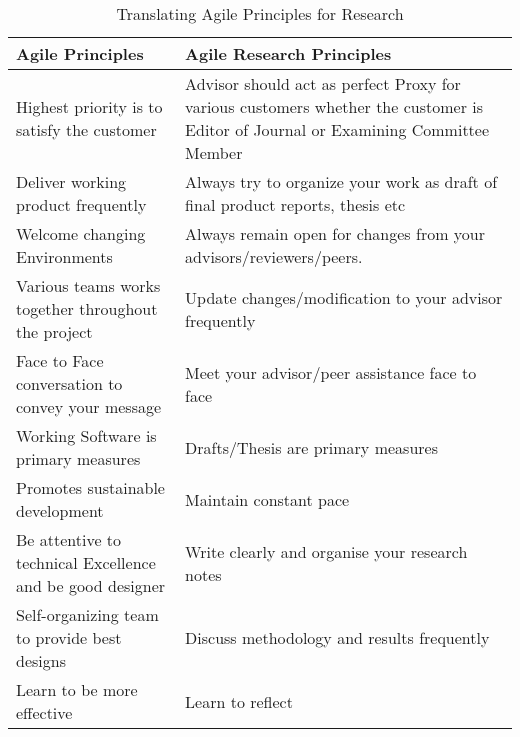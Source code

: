 \begin{table}[htbp]
	\caption{Translating Agile Principles for Research}
	\centering
	\begin{tabular}{|L|L|}
		\hline
		\textbf{Agile Principles} & \textbf{Agile Research Principles}
		\\ \hline
		Highest priority is to satisfy the customer & Advisor should act as perfect Proxy for various customers whether the customer is Editor of Journal or Examining Committee Member
		\\ \hline
		Deliver working product frequently & Always try to organize your work  as draft of final product reports, thesis etc
		\\ \hline
		Welcome changing Environments & Always remain open for changes from your advisors/reviewers/peers.
		\\ \hline
		Various teams works together throughout the project & Update changes/modification to your advisor frequently
		\\ \hline
		Face to Face conversation to convey your message & Meet your advisor/peer assistance face to face
		\\ \hline
		Working Software is primary measures & Drafts/Thesis are primary measures
		\\ \hline
		Promotes sustainable development & Maintain constant pace
		\\ \hline
		Be attentive to technical Excellence and be good designer & Write clearly and organise your research notes
		\\ \hline
		Self-organizing team to provide best designs & Discuss methodology and results frequently
		\\ \hline
		Learn to be more effective & Learn to reflect
		\\ \hline
	\end{tabular}
\label{table:agileResearchPrinciples}
\end{table}



